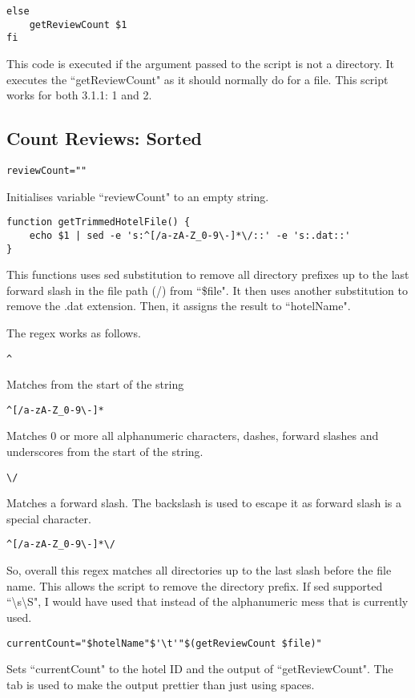 \documentclass[a4paper]{article}
\begin{document}
\begin{lstlisting}
else
	getReviewCount $1
fi
\end{lstlisting}
This code is executed if the argument passed to the script is not a directory.
It executes the ``getReviewCount" as it should normally do for a file. \newline \newline
This script works for both 3.1.1: 1 and 2.

%
\newpage
\subsection{Count Reviews: Sorted}
\begin{lstlisting}
reviewCount=""
\end{lstlisting}
Initialises variable ``reviewCount" to an empty string.

\begin{lstlisting}
function getTrimmedHotelFile() {
	echo $1 | sed -e 's:^[/a-zA-Z_0-9\-]*\/::' -e 's:.dat::'
}
\end{lstlisting}
This functions uses sed substitution to remove all directory prefixes up to the last forward slash in the file path (/) from ``\$file".
It then uses another substitution to remove the .dat extension.
Then, it assigns the result to ``hotelName".

The regex works as follows.
\begin{lstlisting}
^
\end{lstlisting}
Matches from the start of the string
\begin{lstlisting}
^[/a-zA-Z_0-9\-]*
\end{lstlisting}
Matches 0 or more all alphanumeric characters, dashes, forward slashes and underscores from the start of the string.
\begin{lstlisting}
\/
\end{lstlisting}
Matches a forward slash. The backslash is used to escape it as forward slash is a special character.

\begin{lstlisting}
^[/a-zA-Z_0-9\-]*\/
\end{lstlisting}
So, overall this regex matches all directories up to the last slash before the file name.
This allows the script to remove the directory prefix.
If sed supported ``\textbackslash s\textbackslash S", I would have used that instead of the alphanumeric mess that is currently used.

\begin{lstlisting}
currentCount="$hotelName"$'\t'"$(getReviewCount $file)"
\end{lstlisting}
Sets ``currentCount" to the hotel ID and the output of ``getReviewCount".
The tab is used to make the output prettier than just using spaces.
\end{document}
